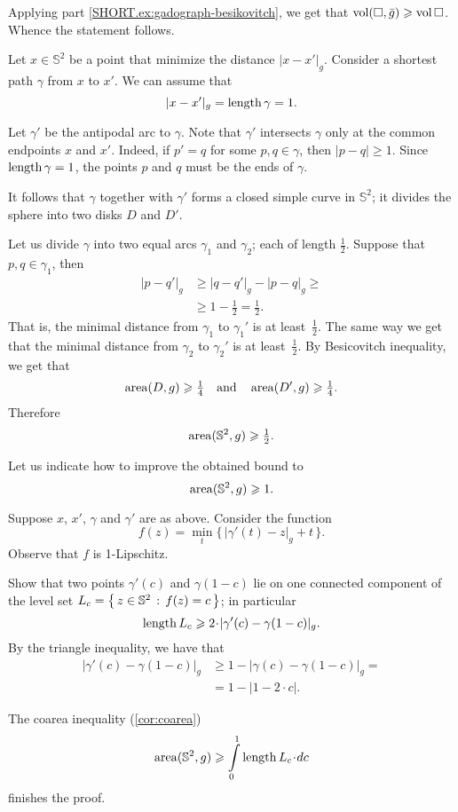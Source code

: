 Applying part \ref{SHORT.ex:gadograph-besikovitch}, we get that $\operatorname{\rm vol}\nolimits(\square,\bar g)\geqslant \operatorname{\rm vol}\nolimits\square$.
Whence the statement follows.


Let $x\in \mathbb{S}^2$ be a point that minimize the distance $|x-x'|_g$.
Consider a shortest path $\gamma$ from $x$ to $x'$.
We can assume that 
\[|x-x'|_g=\mathop{\rm length}\nolimits \gamma=1.\]

Let $\gamma'$ be the antipodal arc to $\gamma$.
Note that $\gamma'$ intersects $\gamma$ only at the common endpoints $x$ and $x'$.
Indeed, if $p'=q$ for some $p,q\in\gamma$, then $|p-q|\ge 1$.
Since $\mathop{\rm length}\nolimits \gamma=1$, the points $p$ and $q$ must be the ends of $\gamma$.

It follows that $\gamma$ together with $\gamma'$ forms a closed simple curve in $\mathbb{S}^2$;
it divides the sphere into two disks $D$ and $D'$.

Let us divide $\gamma$ into two equal arcs $\gamma_1$ and $\gamma_2$; each of length $\tfrac12$.
Suppose that $p,q\in\gamma_1$, then 
\begin{align*}
|p-q'|_g&\ge |q-q'|_g-|p-q|_g\ge
\\
&\ge 1-\tfrac12=\tfrac12.
\end{align*}
That is, the minimal distance from $\gamma_1$ to $\gamma_1'$ is at least~$\tfrac12$.
The same way we get that the minimal distance from $\gamma_2$ to $\gamma_2'$ is at least~$\tfrac12$.
By Besicovitch inequality, we get that 
\[\operatorname{\rm area}\nolimits(D,g)\geqslant \tfrac14\quad\text{and}\quad \operatorname{\rm area}\nolimits(D',g)\geqslant \tfrac14.\]
Therefore 
\[\operatorname{\rm area}\nolimits(\mathbb{S}^2,g)\geqslant\tfrac12.\]

Let us indicate how to improve the obtained bound to
\[\operatorname{\rm area}\nolimits(\mathbb{S}^2,g)\geqslant1.\]

Suppose $x$, $x'$, $\gamma$ and $\gamma'$ are as above.
Consider the function
\[f(z)=\min_t \{\,|\gamma'(t)-z|_g+t\,\}.\]
Observe that $f$ is 1-Lipschitz.

Show that two points $\gamma'(c)$ and $\gamma(1-c)$ lie on one connected component of the level set $L_c=\left\{\,{z\in\mathbb{S}^2}\,:\,{f(z)=c}\,\right\}$;
in particular 
\[\length L_c\ge 2\cdot|\gamma'(c)-\gamma(1-c)|_g.\]
By the triangle inequality, we have that
\begin{align*}
|\gamma'(c)-\gamma(1-c)|_g&\ge 1-|\gamma(c)-\gamma(1-c)|_g=
\\
&=1-|1-2\cdot c|.
\end{align*}

The coarea inequality (\ref{cor:coarea})
\[\area(\mathbb{S}^2,g)\ge \int\limits_0^1\length L_c\cdot dc\]
finishes the proof.


